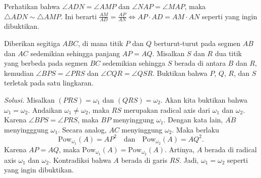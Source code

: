 \documentclass[a4paper, 11pt]{article}
\begin{document}
Perhatikan bahwa $\angle ADN=\angle AMP$ dan $\angle NAP=\angle MAP$, maka $\triangle ADN\sim \triangle AMP$. Ini berarti $\frac{AM}{AD} = \frac{AP}{AN}\iff AP\cdot AD=AM\cdot AN$ seperti yang ingin dibuktikan.
\begin{center}
\end{center}
\newpage
\begin{tcolorbox}[title=\textbf{Soal 6: USAJMO 2012/1}]
Diberikan segitiga $ABC$, di mana titik $P$ dan $Q$ berturut-turut pada segmen $AB$ dan $AC$ sedemikian sehingga panjang $AP=AQ$. Misalkan $S$ dan $R$ dua titik yang berbeda pada segmen $BC$ sedemikian sehingga $S$ berada di antara $B$ dan $R$, kemudian $\angle BPS=\angle PRS$ dan $\angle CQR=\angle QSR$. Buktikan bahwa $P$, $Q$, $R$, dan $S$ terletak pada satu lingkaran.
\end{tcolorbox}
\noindent\textit{Solusi.} Misalkan $(PRS)=\omega_1$ dan $(QRS)=\omega_2$. Akan kita buktikan bahwa $\omega_1=\omega_2$. Andaikan $\omega_1\neq \omega_2$, maka $RS$ merupakan radical axis dari $\omega_1$ dan $\omega_2$. Karena $\angle BPS=\angle PRS$, maka $BP$ menyinggung $\omega_1$. Dengan kata lain, $\overline{AB}$ menyingggung $\omega_1$. Secara analog, $AC$ menyinggung $\omega_2$. Maka berlaku
\[\text{Pow}_{\omega_1}(A)= AP^2\quad \text{dan}\quad \text{Pow}_{\omega_2}(A)= AQ^2.\]
Karena $AP=AQ$, maka $\text{Pow}_{\omega_1}(A)=\text{Pow}_{\omega_2}(A)$. Artinya, $A$ berada di radical axis $\omega_1$ dan $\omega_2$. Kontradiksi bahwa $A$ berada di garis $RS$. Jadi, $\omega_1=\omega_2$ seperti yang ingin dibuktikan.
\end{document}
